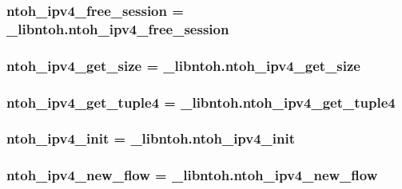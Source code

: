 \hypertarget{namespacelibntoh_a94cd2b71068960ad47a915f4db1848ef}{
\subsubsection[{ntoh\-\_\-ipv4\-\_\-free\-\_\-session}]{\setlength{\rightskip}{0pt plus 5cm}ntoh\-\_\-ipv4\-\_\-free\-\_\-session = \-\_\-libntoh.\-ntoh\-\_\-ipv4\-\_\-free\-\_\-session}}\label{namespacelibntoh_a94cd2b71068960ad47a915f4db1848ef}
\hypertarget{namespacelibntoh_a8fef17498e363f0ebe953ae35b162acf}{
\subsubsection[{ntoh\-\_\-ipv4\-\_\-get\-\_\-size}]{\setlength{\rightskip}{0pt plus 5cm}ntoh\-\_\-ipv4\-\_\-get\-\_\-size = \-\_\-libntoh.\-ntoh\-\_\-ipv4\-\_\-get\-\_\-size}}\label{namespacelibntoh_a8fef17498e363f0ebe953ae35b162acf}
\hypertarget{namespacelibntoh_a35799caaa613c17da8de701139da8314}{
\subsubsection[{ntoh\-\_\-ipv4\-\_\-get\-\_\-tuple4}]{\setlength{\rightskip}{0pt plus 5cm}ntoh\-\_\-ipv4\-\_\-get\-\_\-tuple4 = \-\_\-libntoh.\-ntoh\-\_\-ipv4\-\_\-get\-\_\-tuple4}}\label{namespacelibntoh_a35799caaa613c17da8de701139da8314}
\hypertarget{namespacelibntoh_afc3c5df10dbfd32a8cb5cb9565136e2a}{
\subsubsection[{ntoh\-\_\-ipv4\-\_\-init}]{\setlength{\rightskip}{0pt plus 5cm}ntoh\-\_\-ipv4\-\_\-init = \-\_\-libntoh.\-ntoh\-\_\-ipv4\-\_\-init}}\label{namespacelibntoh_afc3c5df10dbfd32a8cb5cb9565136e2a}
\hypertarget{namespacelibntoh_a134e8c3e980c70bc974cba4092d81ff8}{
\subsubsection[{ntoh\-\_\-ipv4\-\_\-new\-\_\-flow}]{\setlength{\rightskip}{0pt plus 5cm}ntoh\-\_\-ipv4\-\_\-new\-\_\-flow = \-\_\-libntoh.\-ntoh\-\_\-ipv4\-\_\-new\-\_\-flow}}\label{namespacelibntoh_a134e8c3e980c70bc974cba4092d81ff8}
